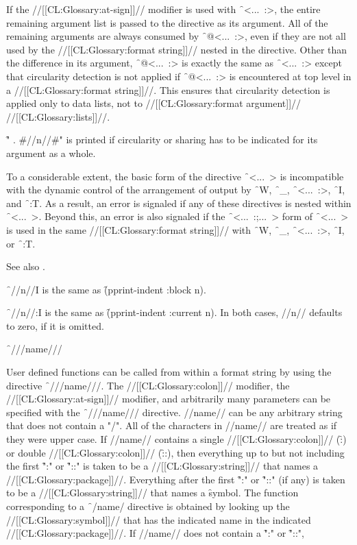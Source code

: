 If the //[[CL:Glossary:at-sign]]// modifier is used with \f{~<...~:>}, the entire remaining argument
list is passed to the directive as its argument.  All of the remaining
arguments are always consumed by \f{~@<...~:>}, even if they are not all used
by the //[[CL:Glossary:format string]]// nested in the directive.  Other than the difference in
its argument, \f{~@<...~:>} is exactly the same as \f{~<...~:>} except that
circularity detection is not applied if \f{~@<...~:>} is encountered at top
level in a //[[CL:Glossary:format string]]//.  This ensures that circularity detection is
applied only to data lists, not to //[[CL:Glossary:format argument]]// //[[CL:Glossary:lists]]//.

\f{" . \#//n//\#"} is printed if circularity or sharing has to be indicated
for its argument as a whole.
 
To a considerable extent, the basic form of the directive \f{~<...~>} is
incompatible with the dynamic control of the arrangement of output by
\f{~W}, \f{~_}, \f{~<...~:>}, \f{~I}, and \f{~:T}.  As a result, an error 
is signaled if any of these directives is nested within \f{~<...~>}.  
Beyond this, an error is also signaled if the \f{~<...~:;...~>} form of
\f{~<...~>} is used in the same //[[CL:Glossary:format string]]// with 
\f{~W}, \f{~_}, \f{~<...~:>}, \f{~I}, or \f{~:T}.
 
See also \secref\TildeLessThanJustification.

\endsubsubsection%

 
\f{~//n//I}  is the same as \f{(pprint-indent :block n)}.

\f{~//n//:I} is the same as \f{(pprint-indent :current n)}.
In both cases, //n// defaults to zero, if it is omitted.
 
\endsubsubsection%


\f{~///name///}

User defined functions can be called from within a format
string by using the directive \f{~///name///}.
The //[[CL:Glossary:colon]]// modifier, the //[[CL:Glossary:at-sign]]// modifier, and arbitrarily many parameters 
can be specified with the \f{~///name///} directive.
//name// can be any arbitrary string that does not contain a "/".
All of the characters in //name// are treated as if they were upper case.
If //name// contains a single //[[CL:Glossary:colon]]// (\f{:}) or double //[[CL:Glossary:colon]]// (\f{::}),
then everything up to but not including the first \f{":"} or \f{"::"}
is taken to be a //[[CL:Glossary:string]]// that names a //[[CL:Glossary:package]]//.
Everything after the first \f{":"} or \f{"::"} (if any) is taken to be a 
//[[CL:Glossary:string]]// that names a \f{symbol}.  The function corresponding to a 
\f{~/name/} directive is obtained by looking up the //[[CL:Glossary:symbol]]//
that has the indicated name in the indicated //[[CL:Glossary:package]]//.
If //name// does not contain a \f{":"} or \f{"::"},

